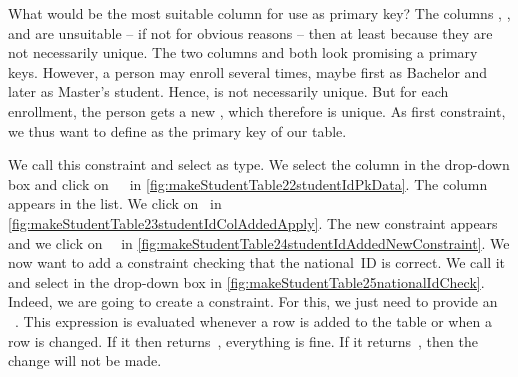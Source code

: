 What would be the most suitable column for use as primary key?
The columns , , and  are unsuitable -- if not for obvious reasons -- then at least because they are not necessarily unique.
The two columns  and  both look promising a primary keys.
However, a person may enroll several times, maybe first as Bachelor and later as Master's student.
Hence,  is not necessarily unique.
But for each enrollment, the person gets a new , which therefore is unique.
As first constraint, we thus want to define  as the primary key of our table.

We call this constraint  and select  as type.
We select the column  in the  drop-down box and click on~~\pgmodelerAddItem\ in \cref{fig:makeStudentTable22studentIdPkData}.
The column  appears in the  list.
We click on~ in \cref{fig:makeStudentTable23studentIdColAddedApply}.%
%
%
%
The new constraint appears and we click on ~\pgmodelerAddItem\ in \cref{fig:makeStudentTable24studentIdAddedNewConstraint}.
We now want to add a constraint checking that the national~ID is correct.
We call it  and select  in the  drop-down box in \cref{fig:makeStudentTable25nationalIdCheck}.
Indeed, we are going to create a  constraint.
For this, we just need to provide an \sql\ .
This expression is evaluated whenever a row is added to the table or when a row is changed.
If it then returns~, everything is fine.
If it returns~, then the change will not be made.

